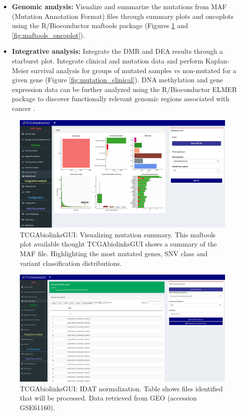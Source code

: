 \begin{itemize}
 	\item \textbf{Genomic analysis:} Visualize and summarize the mutations from MAF (Mutation Annotation Format) files through summary plots and oncoplots using the R/Bioconductor maftools package \cite{Gu20052016,Maftools} (Figures \ref{fig:maftools_summary} and \ref{fig:maftools_oncoplot}). %
	\item \textbf{Integrative analysis:} Integrate the DMR and DEA results through a starburst plot. Integrate clinical and mutation data and perform Kaplan-Meier survival analysis for groups of mutated samples vs non-mutated for a given gene (Figure \ref{fig:mutation_clinical}). DNA methylation and gene expression data can be further analyzed using the R/Bioconductor ELMER package to discover functionally relevant genomic regions associated with cancer \cite{yao2015inferring, ELMER2}.
\end{itemize}


\begin{figure}
\includegraphics[width=1.0\linewidth]{images/maftools_summary.png}
\caption[TCGAbiolinksGUI: Visualizing mutation summary]{TCGAbiolinksGUI: Visualizing mutation summary. This maftools plot available thought TCGAbiolinksGUI shows a summary of the MAF file. Highlighting the most mutated genes, SNV class and variant classification distributions. }
\label{fig:maftools_summary}
\end{figure}


  \begin{figure}[h!]
  \centering
  \includegraphics[width=1.0\textwidth]{images/idat.pdf}
  \caption[TCGAbiolinksGUI: IDAT normalization]{TCGAbiolinksGUI: IDAT normalization. Table shows files identified that will be processed. Data retrieved from GEO (accession GSE61160). }
  \label{fig:idat}
   \end{figure}

